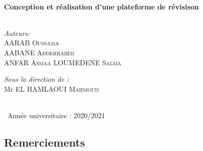\documentclass{article}
\begin{document}
\begin{titlepage}
\HRule \\[0.4cm]
{ \huge \bfseries Conception et réalisation d'une plateforme de révisison}\\[0.4cm] %
\HRule \\[1cm]
 
\vspace{1.2cm}
\begin{minipage}{0.4\textwidth}
\begin{flushleft} \large
\emph{Auteurs:}\\
   AARAB\textsc{	Oussama} \\
   AABANE\textsc{	Abderrahim} \\
   ANFAR\textsc{	Asmaa}
   LOUMEDENE\textsc{	Salma}\\
\emph{}

\end{flushleft}
\end{minipage}
\begin{minipage}{0.5\textwidth}
\begin{flushright} \large
\emph{Sous la direction de :} \\
Mr EL HAMLAOUI  \textsc{Mahmoud} 
\end{flushright}
\end{minipage}\\[5cm]

{\large \  Année universitaire : 2020/2021}\\[0.5cm] %

\vfill %

\end{titlepage}
\begin{center}
\centering
    \hspace{4cm}\section*{Remerciements}
\end{center}
\end{document}
